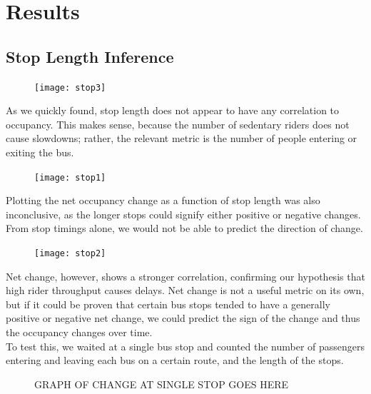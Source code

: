 \documentclass[letterpaper,abstract=on,titlepage=false]{scrreprt}
\begin{document}
\section*{Results}

\subsection*{Stop Length Inference}
	\begin{figure}[H]
	\texttt{[image: stop3]}
	\centering
	\end{figure}
	As we quickly found, stop length does not appear to have any correlation to occupancy.
	This makes sense, because the number of sedentary riders does not cause slowdowns; rather, the relevant metric is the number of people entering or exiting the bus.

	\begin{figure}[H]
	\texttt{[image: stop1]}
	\centering
	\end{figure}

	Plotting the net occupancy change as a function of stop length was also inconclusive, as the longer stops could signify either positive or negative changes.
	From stop timings alone, we would not be able to predict the direction of change.

	\begin{figure}[H]
	\texttt{[image: stop2]}
	\centering
	\end{figure}

	Net change, however, shows a stronger correlation, confirming our hypothesis that high rider throughput causes delays.
	Net change is not a useful metric on its own, but if it could be proven that certain bus stops tended to have a generally positive or negative net change, we could predict the sign of the change and thus the occupancy changes over time.
	\\
	To test this, we waited at a single bus stop and counted the number of passengers entering and leaving each bus on a certain route, and the length of the stops.

	\begin{figure}[H]
	GRAPH OF CHANGE AT SINGLE STOP GOES HERE
	\centering
	\end{figure}
\end{document}

